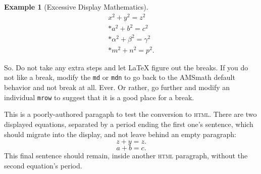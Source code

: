 \documentclass{amsart}
\theoremstyle{plain}%
\theoremstyle{definition}%
\newtheorem{example}[theorem]{Example}
\theoremstyle{remark}%
\newcommand{\mono}[1]{\texttt{#1}}
\newcommand{\initialism}[1]{\textsc{\MakeLowercase{#1}}}
\numberwithin{equation}{section}
\begin{document}
\begin{example}[Excessive Display Mathematics]
\begin{gather}
x^2+y^2=z^2\label{section-mathematics-4-10-3-2-45}\\*
a^2+b^2=c^2\label{section-mathematics-4-10-3-2-46}\\*
\alpha^2+\beta^2=\gamma^2\label{section-mathematics-4-10-3-2-47}\\*
m^2+n^2=p^2\text{.}\label{section-mathematics-4-10-3-2-48}
\end{gather}
%
\par
So.  Do not take any extra steps and let \LaTeX{} figure out the breaks.  If you do not like a break, modify the \mono{md} or \mono{mdn} to go back to the AMSmath default behavior and not break at all.  Ever.  Or rather, go further and modify an individual \mono{mrow} to suggest that it is a good place for a break.%
\end{example}
This is a poorly-authored paragaph to test the conversion to \initialism{HTML}.  There are two displayed equations, separated by a period ending the first one's sentence, which should migrate into the display, and not leave behind an empty paragraph:%
\begin{equation*}
z+y = z\text{.}
\end{equation*}
%
\begin{equation*}
a + b = c\text{.}
\end{equation*}
This final sentence should remain, inside another \initialism{HTML} paragraph, without the second equation's period.%
%
%
\typeout{************************************************}
\typeout{************************************************}
%
\end{document}
